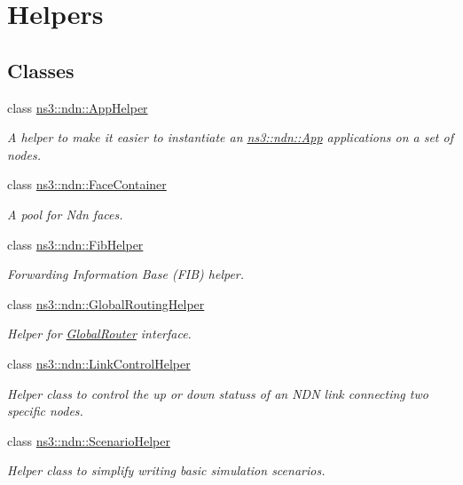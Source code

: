 \hypertarget{group__ndn-helpers}{}\section{Helpers}
\label{group__ndn-helpers}
\subsection*{Classes}
\begin{DoxyCompactItemize}
\item 
class \hyperlink{classns3_1_1ndn_1_1AppHelper}{ns3\+::ndn\+::\+App\+Helper}
\begin{DoxyCompactList}\small\item\em A helper to make it easier to instantiate an \hyperlink{classns3_1_1ndn_1_1App}{ns3\+::ndn\+::\+App} applications on a set of nodes. \end{DoxyCompactList}\item 
class \hyperlink{classns3_1_1ndn_1_1FaceContainer}{ns3\+::ndn\+::\+Face\+Container}
\begin{DoxyCompactList}\small\item\em A pool for Ndn faces. \end{DoxyCompactList}\item 
class \hyperlink{classns3_1_1ndn_1_1FibHelper}{ns3\+::ndn\+::\+Fib\+Helper}
\begin{DoxyCompactList}\small\item\em Forwarding Information Base (F\+IB) helper. \end{DoxyCompactList}\item 
class \hyperlink{classns3_1_1ndn_1_1GlobalRoutingHelper}{ns3\+::ndn\+::\+Global\+Routing\+Helper}
\begin{DoxyCompactList}\small\item\em Helper for \hyperlink{classns3_1_1ndn_1_1GlobalRouter}{Global\+Router} interface. \end{DoxyCompactList}\item 
class \hyperlink{classns3_1_1ndn_1_1LinkControlHelper}{ns3\+::ndn\+::\+Link\+Control\+Helper}
\begin{DoxyCompactList}\small\item\em Helper class to control the up or down statuss of an N\+DN link connecting two specific nodes. \end{DoxyCompactList}\item 
class \hyperlink{classns3_1_1ndn_1_1ScenarioHelper}{ns3\+::ndn\+::\+Scenario\+Helper}
\begin{DoxyCompactList}\small\item\em Helper class to simplify writing basic simulation scenarios. \end{DoxyCompactList}\item 

\end{DoxyCompactItemize}
